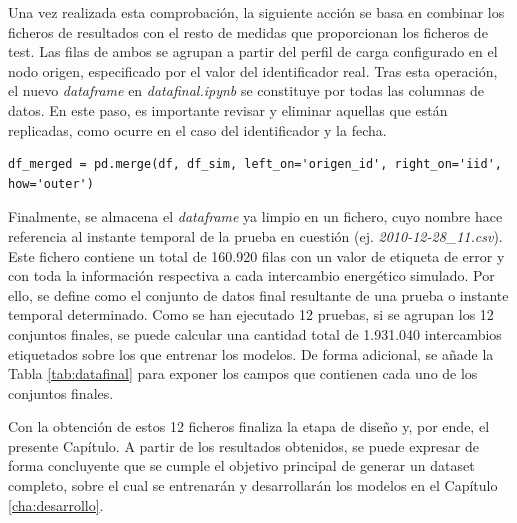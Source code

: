 \vspace{3mm}

Una vez realizada esta comprobación, la siguiente acción se basa en combinar los ficheros de resultados con el resto de medidas que proporcionan los ficheros de test. Las filas de ambos se agrupan a partir del perfil de carga configurado en el nodo origen, especificado por el valor del identificador real. Tras esta operación, el nuevo \textit{dataframe} en \textit{datafinal.ipynb} se constituye por todas las columnas de datos. En este paso, es importante revisar y eliminar aquellas que están replicadas, como ocurre en el caso del identificador y la fecha. 

\vspace{3mm}

\begin{lstlisting}[style=Python, caption={Combinación de ficheros de resultados y de test}]
    df_merged = pd.merge(df, df_sim, left_on='origen_id', right_on='iid', how='outer')
\end{lstlisting}

\vspace{3mm}

Finalmente, se almacena el \textit{dataframe} ya limpio en un fichero, cuyo nombre hace referencia al instante temporal de la prueba en cuestión (ej. \textit{2010-12-28\_11.csv}). Este fichero contiene un total de 160.920 filas con un valor de etiqueta de error y con toda la información respectiva a cada intercambio energético simulado. Por ello, se define como el conjunto de datos final resultante de una prueba o instante temporal determinado. Como se han ejecutado 12 pruebas, si se agrupan los 12 conjuntos finales, se puede calcular una cantidad total de 1.931.040 intercambios etiquetados sobre los que entrenar los modelos. De forma adicional, se añade la Tabla \ref{tab:datafinal} para exponer los campos que contienen cada uno de los conjuntos finales.

\vspace{3mm}

Con la obtención de estos 12 ficheros finaliza la etapa de diseño y, por ende, el presente Capítulo. A partir de los resultados obtenidos, se puede expresar de forma concluyente que se cumple el objetivo principal de generar un dataset completo, sobre el cual se entrenarán y desarrollarán los modelos en el Capítulo \ref{cha:desarrollo}. 


